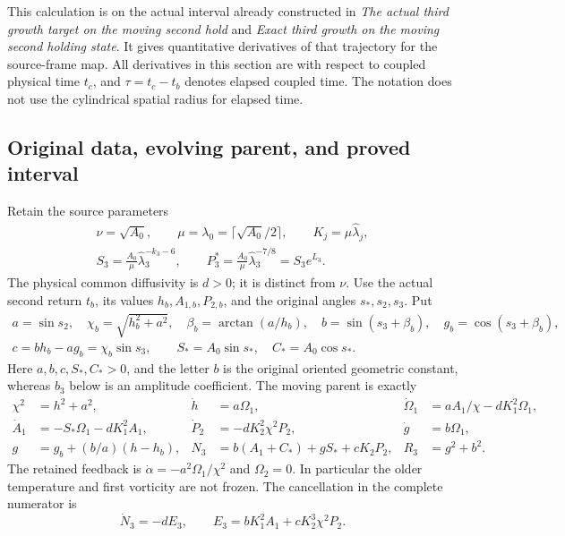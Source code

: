 This calculation is on the actual interval already constructed in
\emph{The actual third growth target on the moving second hold} and
\emph{Exact third growth on the moving second holding state}. It gives
quantitative derivatives of that trajectory for the source-frame map.
All derivatives in this section are with respect to coupled physical
time $t_c$, and $\tau=t_c-t_b$ denotes elapsed coupled time. The notation
does not use the cylindrical spatial radius for elapsed time.

\subsection{Original data, evolving parent, and proved interval}

Retain the source parameters
\begin{equation}\label{tgdc:original}
\begin{gathered}
 \nu=\sqrt{A_0},\qquad
 \mu=\lambda_0=\lceil\sqrt{A_0}/2\rceil,\qquad
 K_j=\mu\widehat\lambda_j,\\
 S_3=\frac{A_0}{\mu}\widehat\lambda_3^{-k_3-6},\qquad
 P_3^*=\frac{A_0}{\mu}\widehat\lambda_3^{-7/8}=S_3e^{L_3}.
\end{gathered}
\end{equation}
The physical common diffusivity is $d>0$; it is distinct from $\nu$.
Use the actual second return $t_b$, its values $h_b,A_{1,b},P_{2,b}$,
and the original angles $s_*,s_2,s_3$. Put
\begin{equation}\label{tgdc:constants}
\begin{gathered}
 a=\sin s_2,\quad \chi_b=\sqrt{h_b^2+a^2},\quad
 \beta_b=\arctan(a/h_b),\quad
 b=\sin(s_3+\beta_b),\quad g_b=\cos(s_3+\beta_b),\\
 c=bh_b-ag_b=\chi_b\sin s_3,\qquad
 S_*=A_0\sin s_*,\quad C_*=A_0\cos s_*.
\end{gathered}
\end{equation}
Here $a,b,c,S_*,C_*>0$, and the letter $b$ is the original oriented
geometric constant, whereas $b_3$ below is an amplitude coefficient.
The moving parent is exactly
\begin{equation}\label{tgdc:parent}
\begin{aligned}
 \chi^2&=h^2+a^2,& \dot h&=a\Omega_1,&
 \dot\Omega_1&=aA_1/\chi-dK_1^2\Omega_1,\\
 \dot A_1&=-S_*\Omega_1-dK_1^2A_1,&
 \dot P_2&=-dK_2^2\chi^2P_2,&
 \dot g&=b\Omega_1,\\
 g&=g_b+(b/a)(h-h_b),&
 N_3&=b(A_1+C_*)+gS_*+cK_2P_2,&
 R_3&=g^2+b^2.
\end{aligned}
\end{equation}
The retained feedback is $\dot\alpha=-a^2\Omega_1/\chi^2$ and
$\Omega_2=0$. In particular the older temperature and first vorticity
are not frozen. The cancellation in the complete numerator is
\begin{equation}\label{tgdc:numerator}
 \dot N_3=-dE_3,\qquad
 E_3=bK_1^2A_1+cK_2^3\chi^2P_2.
\end{equation}

